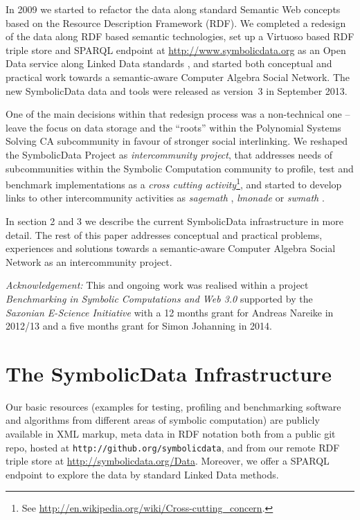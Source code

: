 \documentclass{llncs}
\newcommand{\SD}{{\sc Symbolic\-Data}}
\begin{document}
In 2009 we started to refactor the data along standard Semantic Web concepts
based on the Resource Description Framework (RDF).  We completed a redesign of
the data along RDF based semantic technologies, set up a Virtuoso
\cite{Virtuoso} based RDF triple store and SPARQL endpoint at
\url{http://www.symbolicdata.org} as an Open Data service along Linked Data
standards \cite{lod}, and started both conceptual and practical work towards a
semantic-aware Computer Algebra Social Network. The new {\SD} data and tools
were released as version~3 in September 2013.

One of the main decisions within that redesign process was a non-technical one
-- leave the focus on data storage and the ``roots'' within the Polynomial
Systems Solving CA subcommunity in favour of stronger social interlinking. We
reshaped the {\SD} Project as \emph{intercommunity project}, that addresses
needs of subcommunities within the Symbolic Computation community to profile,
test and benchmark implementations as a \emph{cross cutting
  activity}\footnote{See
  \url{http://en.wikipedia.org/wiki/Cross-cutting_concern}.}, and started to
develop links to other intercommunity activities as \emph{sagemath}
\cite{Sagemath}, \emph{lmonade} \cite{lmonade} or \emph{swmath} \cite{swmath}.

In section 2 and 3 we describe the current {\SD} infrastructure in more
detail.  The rest of this paper addresses conceptual and practical problems,
experiences and solutions towards a semantic-aware Computer Algebra Social
Network as an intercommunity project.

\emph{Acknowledgement:} This and ongoing work was realised within a project
\emph{Benchmarking in Symbolic Computations and Web 3.0} supported by the
\emph{Saxonian E-Science Initiative} \cite{E-Science-Sachsen} with a 12 months
grant for Andreas Nareike in 2012/13 and a five months grant for Simon
Johanning in 2014.

\section{The {\SD} Infrastructure}

Our basic resources (examples for testing, profiling and benchmarking software
and algorithms from different areas of symbolic computation) are publicly
available in XML markup, meta data in RDF notation both from a public git
repo, hosted at \texttt{http://github.org/symbolicdata}, and from our remote
RDF triple store at \url{http://symbolicdata.org/Data}. Moreover, we offer a
SPARQL endpoint \cite{sdsparql} to explore the data by standard Linked Data
methods.
\end{document}
